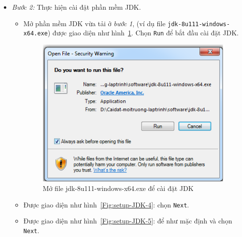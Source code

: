 \documentclass[13pt,a4paper]{extreport}
\begin{document}
\begin{itemize}
		\item \textit{Bước 2:} Thực hiện cài đặt phần mềm JDK.
			\begin{itemize}
				\item Mở phần mềm JDK vừa tải ở \textit{bước 1}, (ví dụ file \verb|jdk-8u111-windows-x64.exe|) được giao diện như hình~\ref{Fig:setup-JDK-3}. Chọn \verb|Run| để bắt đầu cài đặt JDK.
					\begin{figure}[!h]
						\vspace{-.25cm}
						\begin{center}
							\includegraphics[scale=.65]{setup-JDK-3.png}
						\end{center}
						\vspace{-.25cm}
						\caption{Mở file jdk-8u111-windows-x64.exe để cài đặt JDK}
						\label{Fig:setup-JDK-3}
						\vspace{-.25cm}				
					\end{figure}

				\item Được giao diện như hình~\ref{Fig:setup-JDK-4}: chọn \verb|Next|.
				
				\item Được giao diện như hình~\ref{Fig:setup-JDK-5}: để như mặc định và chọn \verb|Next|.
				

\end{itemize}
\end{itemize}
\end{document}
